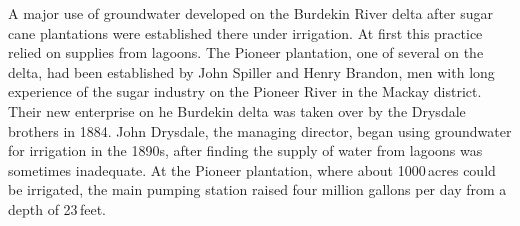 A major use of groundwater developed on the Burdekin River
 delta after sugar cane
plantations were established there under irrigation.  At first this
practice relied on supplies from lagoons.  The Pioneer plantation, one
of several on the delta, had been established by John Spiller and
  Henry Brandon,  men with long
experience of the sugar industry on the Pioneer River
 in the Mackay district.  Their new enterprise on
he Burdekin delta was taken over by the Drysdale brothers
 in 1884.  John Drysdale, the managing director,
began using groundwater for irrigation in the 1890s, after finding the
supply of water from lagoons was sometimes inadequate.  At the Pioneer
plantation, where about 1000\,acres could be irrigated, the main
pumping station raised four million gallons per day from a depth
of 
23\,feet.


